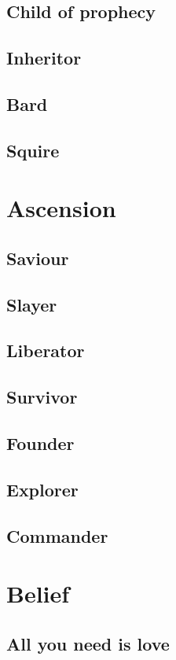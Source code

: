 \documentclass{report}
\begin{document}
\subsection{Child of prophecy}
\subsection{Inheritor}
\subsection{Bard}
\subsection{Squire}


\section{Ascension}
\subsection{Saviour}
\subsection{Slayer}
\subsection{Liberator}
\subsection{Survivor}
\subsection{Founder}
\subsection{Explorer}
\subsection{Commander}


\section{Belief}
\subsection{All you need is love}
\end{document}
